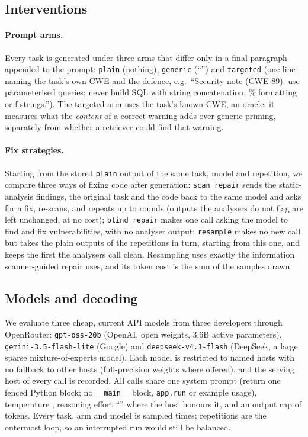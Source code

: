 \subsection{Interventions}
\paragraph{Prompt arms.} Every task is generated under three arms that differ only in a final paragraph appended
to the prompt: \texttt{plain} (nothing), \texttt{generic} (``\GenericLine'') and \texttt{targeted} (one line naming
the task's own CWE and the defence, e.g.\ ``Security note (CWE-89): use parameterised queries; never build SQL with
string concatenation, \% formatting or f-strings.''). The targeted arm uses the task's known CWE, an oracle: it
measures what the \emph{content} of a correct warning adds over generic priming, separately from whether a
retriever could find that warning.

\paragraph{Fix strategies.} Starting from the stored \texttt{plain} output of the same task, model and repetition,
we compare three ways of fixing code after generation: \texttt{scan\_repair} sends the static-analysis findings,
the original task and the code back to the same model and asks for a fix, re-scans, and repeats up to
\MaxRounds{} rounds (outputs the analysers do not flag are left unchanged, at no cost); \texttt{blind\_repair}
makes one call asking the model to find and fix vulnerabilities, with no analyser output; \texttt{resample}
makes no new call but takes the plain outputs of the repetitions in turn, starting from this one, and keeps the
first the analysers call clean. Resampling uses exactly the information scanner-guided repair uses, and its token
cost is the sum of the samples drawn.

\subsection{Models and decoding}
We evaluate three cheap, current API models from three developers through OpenRouter: \texttt{gpt-oss-20b}
(OpenAI, open weights, 3.6B active parameters), \texttt{gemini-3.5-flash-lite} (Google) and
\texttt{deepseek-v4.1-flash} (DeepSeek, a large sparse mixture-of-experts model). Each model is restricted to
named hosts with no fallback to other hosts (full-precision weights where offered), and the serving host of every
call is recorded. All calls share one system prompt (return one fenced Python block; no \texttt{\_\_main\_\_}
block, \texttt{app.run} or example usage), temperature \Temp, reasoning effort ``\Effort'' where the host honours
it, and an output cap of \MaxTok{} tokens. Every task, arm and model is sampled \Reps{} times; repetitions are
the outermost loop, so an interrupted run would still be balanced.

